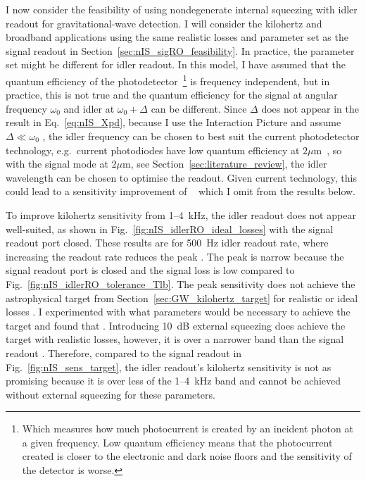 I now consider the feasibility of using nondegenerate internal squeezing with idler readout for gravitational-wave detection. I will consider the kilohertz and broadband applications using the same realistic losses and parameter set as the signal readout in Section~\ref{sec:nIS_sigRO_feasibility}. 
In practice, the parameter set might be different for idler readout. In this model, I have assumed that the quantum efficiency of the photodetector~\footnote{Which measures how much photocurrent is created by an incident photon at a given frequency. Low quantum efficiency means that the photocurrent created is closer to the electronic and dark noise floors and the sensitivity of the detector is worse. } is frequency independent, but in practice, this is not true and the quantum efficiency for the signal at angular frequency $\omega_0$ and idler at $\omega_0+\Delta$ can be different. Since $\Delta$ does not appear in the result in Eq.~\ref{eq:nIS_Xpd}, because I use the Interaction Picture and assume $\Delta\ll\omega_0$ , the idler frequency can be chosen to best suit the current photodetector technology, e.g.\ current photodiodes have low quantum efficiency at $2 \mu\text{m}$~\cite{}, so with the signal mode at $2 \mu\text{m}$, see Section~\ref{sec:literature_review}, the idler wavelength can be chosen to optimise the readout. Given current technology, this could lead to a sensitivity improvement of ~\cite{} which I omit from the results below.

To improve kilohertz sensitivity from 1--4~kHz, the idler readout does not appear well-suited, as shown in Fig.~\ref{fig:nIS_idlerRO_ideal_losses} with the signal readout port closed. These results are for 500~Hz idler readout rate, where increasing the readout rate reduces the peak . The peak is narrow because the signal readout port is closed and the signal loss is low compared to Fig.~\ref{fig:nIS_idlerRO_tolerance_Tlb}. The peak sensitivity does not achieve the astrophysical target from Section~\ref{sec:GW_kilohertz_target} for realistic or ideal  losses . I experimented with what parameters would be necessary to achieve the target and found that . Introducing 10~dB external squeezing does achieve the target with realistic losses, however, it is over a narrower band than the signal readout . Therefore, compared to the signal readout in Fig.~\ref{fig:nIS_sens_target}, the idler readout's kilohertz sensitivity is not as promising because it is over less of the 1--4~kHz band and cannot be achieved without external squeezing for these parameters.

